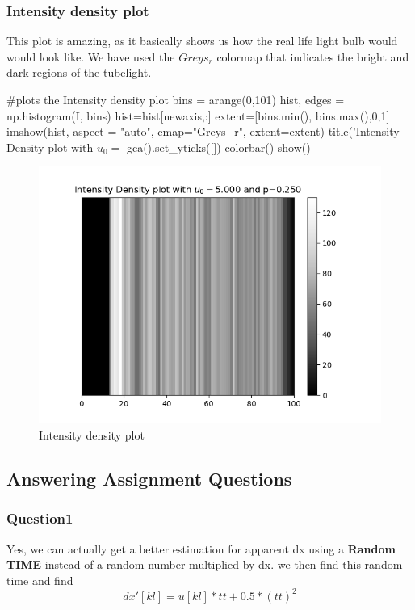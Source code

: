 \documentclass[11pt]{article}
\begin{document}
\subsubsection{Intensity density plot}

This plot is amazing, as it basically shows us how the real life light bulb would would look like. We have used the $Greys_r$ colormap that indicates the bright and dark regions of the tubelight.

\begin{python}
#plots the Intensity density plot
bins = arange(0,101)
hist, edges = np.histogram(I, bins)
hist=hist[newaxis,:]
extent=[bins.min(), bins.max(),0,1]
imshow(hist, aspect = "auto", cmap="Greys_r", extent=extent)
title('Intensity Density plot with $u_0=$%
gca().set_yticks([])
colorbar()
show()

\end{python}

\begin{figure}[H]
    \centering
    \includegraphics[scale = 1]{1_d.png}
    \caption{Intensity density plot}
\end{figure}




\subsection{Answering Assignment Questions}
\subsubsection{Question1}
Yes, we can actually get a better estimation for apparent dx using a \textbf{Random TIME} instead of a random number multiplied by dx.
we then find this random time and find
\begin{equation}
    dx'[kl] = u[kl]*tt + 0.5*(tt)^2
\end{equation}
\end{document}
